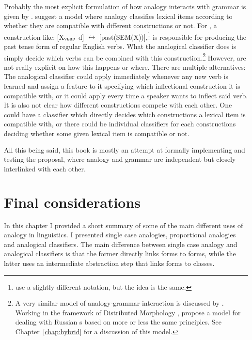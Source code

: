 Probably the most explicit formulation of how analogy interacts with grammar is given by \textcite{Bybee.2015}. \citeauthor{Bybee.2015} suggest a model where analogy classifies lexical items according to whether they are compatible with different constructions or not. For \textcite{Bybee.2015}, a construction like: [X$_{\textsc{verb}}$-d] $\leftrightarrow$ [past(SEM(X))],\footnote{\textcite{Bybee.2015} use a slightly different notation, but the idea is the same.} is responsible for producing the past tense form of regular English verbs. What the analogical classifier does is simply decide which verbs can be combined with this construction.\footnote{A very similar model of analogy-grammar interaction is discussed by \textcite{Gouskova.2015}. Working in the framework of Distributed Morphology \autocite{Halle.1993}, \textcite{Gouskova.2015} propose a model for dealing with Russian s based on more or less the same principles. See Chapter~\ref{chap:hybrid} for a discussion of this model.} However, \textcite{Bybee.2015} are not really explicit on how this happens or where. There are multiple alternatives: The analogical classifier could apply immediately whenever any new verb is learned and assign a feature to it specifying which inflectional construction it is compatible with, or it could apply every time a speaker wants to inflect said verb. It is also not clear how different constructions compete with each other. One could have a classifier which directly decides which constructions a lexical item is compatible with, or there could be individual classifiers for each constructions deciding whether some given lexical item is compatible or not.

All this being said, this book is mostly an attempt at formally implementing and testing the \citeauthor{Bybee.2015} proposal, where analogy and grammar are independent but closely interlinked with each other.

\section{Final considerations}

\largerpage
In this chapter I provided a short summary of some of the main different uses of analogy in linguistics. I presented single case analogies, proportional analogies and analogical classifiers. The main difference between single case analogy and analogical classifiers is that the former directly links forms to forms, while the latter uses an intermediate abstraction step that links forms to classes.

